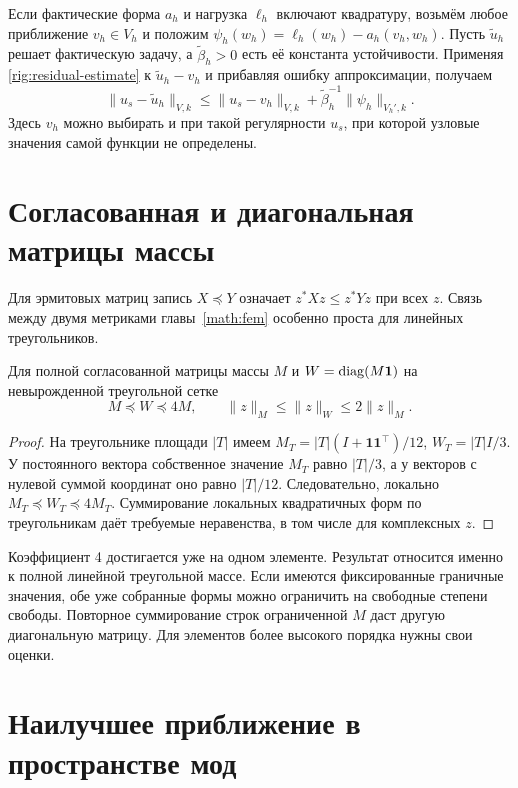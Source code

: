 Если фактические форма $a_h$ и нагрузка $\ell_h$ включают квадратуру,
возьмём любое приближение $v_h\in V_h$ и положим
$\psi_h(w_h)=\ell_h(w_h)-a_h(v_h,w_h)$. Пусть $\widetilde u_h$
решает фактическую задачу, а $\widetilde\beta_h>0$ есть её константа
устойчивости. Применяя \eqref{rig:residual-estimate} к
$\widetilde u_h-v_h$ и прибавляя ошибку аппроксимации, получаем
\begin{equation}
 \|u_s-\widetilde u_h\|_{V,k}\le\|u_s-v_h\|_{V,k}
                   +\widetilde\beta_h^{-1}\|\psi_h\|_{V_h',k}.
 \label{rig:consistency-residual}
\end{equation}
Здесь $v_h$ можно выбирать и при такой регулярности $u_s$, при которой
узловые значения самой функции не определены.

\section{Согласованная и диагональная матрицы массы}
\label{rig:mass-equivalence}

Для эрмитовых матриц запись $X\preceq Y$ означает
$z^*Xz\le z^*Yz$ при всех $z$. Связь между двумя метриками
главы~\ref{math:fem} особенно проста для линейных треугольников.

\begin{theorem}
Для полной согласованной матрицы массы $M$ и $W=\operatorname{diag}(M\bm1)$ на
невырожденной треугольной сетке
\begin{equation}
 M\preceq W\preceq4M,\qquad
 \|z\|_M\le\|z\|_W\le2\|z\|_M.\label{rig:mass-bounds}
\end{equation}
\end{theorem}
\begin{proof}
На треугольнике площади $|T|$ имеем
$M_T=|T|(I+\bm1\bm1^\top)/12$, $W_T=|T|I/3$.
У постоянного вектора собственное значение $M_T$ равно $|T|/3$,
а у векторов с нулевой суммой координат оно равно $|T|/12$.
Следовательно, локально $M_T\preceq W_T\preceq4M_T$.
Суммирование локальных квадратичных форм по треугольникам даёт требуемые
неравенства, в том числе для комплексных $z$.
\end{proof}
Коэффициент 4 достигается уже на одном элементе. Результат относится
именно к полной линейной треугольной массе. Если имеются фиксированные
граничные значения, обе уже собранные формы можно ограничить на свободные
степени свободы. Повторное суммирование строк ограниченной $M$ даст другую
диагональную матрицу. Для элементов более высокого порядка нужны свои оценки.

\section{Наилучшее приближение в пространстве мод}
\label{rig:projection}


